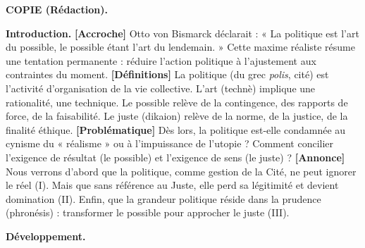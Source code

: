 \documentclass[11pt]{article}
\newcommand{\cle}[1]{{\popxbold\color{popdark}#1}}
\begin{document}
\begin{exoresolu}
\textbf{COPIE (Rédaction).}

\textbf{Introduction.}
\textbf{[Accroche]} Otto von Bismarck déclarait : « La politique est l'art du possible, le possible étant l'art du lendemain. » Cette maxime réaliste résume une tentation permanente : réduire l'action politique à l'ajustement aux contraintes du moment.
\textbf{[Définitions]} La \cle{politique} (du grec \emph{polis}, cité) est l'activité d'organisation de la vie collective. L'\cle{art} (technè) implique une rationalité, une technique. Le \cle{possible} relève de la contingence, des rapports de force, de la faisabilité. Le \cle{juste} (dikaion) relève de la norme, de la justice, de la finalité éthique.
\textbf{[Problématique]} Dès lors, la politique est-elle condamnée au cynisme du « réalisme » ou à l'impuissance de l'utopie ? Comment concilier l'exigence de résultat (le possible) et l'exigence de sens (le juste) ?
\textbf{[Annonce]} Nous verrons d'abord que la politique, comme gestion de la Cité, ne peut ignorer le réel (I). Mais que sans référence au Juste, elle perd sa légitimité et devient domination (II). Enfin, que la grandeur politique réside dans la \cle{prudence} (phronésis) : transformer le possible pour approcher le juste (III).

\textbf{Développement.}


\end{exoresolu}
\end{document}

